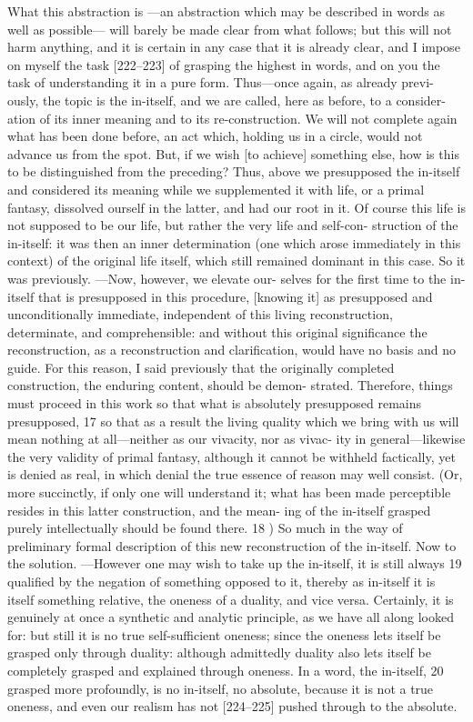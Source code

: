 What this abstraction is
—an abstraction which may be described in words as
well as possible—
will barely be made clear from what follows; but this will not
harm anything, and it is certain in any case that it is already clear, and I impose
on myself the task [222–223] of grasping the highest in words, and on you the
task of understanding it in a pure form.
Thus—once again, as already previ-
ously, the topic is the in-itself, and we are called, here as before, to a consider-
ation of its inner meaning and to its re-construction.
We will not complete
again what has been done before, an act which, holding us in a circle, would
not advance us from the spot.
But, if we wish [to achieve] something else, how
is this to be distinguished from the preceding? Thus, above we presupposed the
in-itself and considered its meaning while we supplemented it with life, or a
primal fantasy, dissolved ourself in the latter, and had our root in it.
Of course
this life is not supposed to be our life, but rather the very life and self-con-
struction of the in-itself: it was then an inner determination (one which arose
immediately in this context) of the original life itself, which still remained
dominant in this case.
So it was previously.
—Now, however, we elevate our-
selves for the first time to the in-itself that is presupposed in this procedure,
[knowing it] as presupposed and unconditionally immediate, independent of
this living reconstruction, determinate, and comprehensible: and without this
original significance the reconstruction, as a reconstruction and clarification,
would have no basis and no guide.
For this reason, I said previously that the
originally completed construction, the enduring content, should be demon-
strated.
Therefore, things must proceed in this work so that what is absolutely
presupposed remains presupposed, 17 so that as a result the living quality which
we bring with us will mean nothing at all—neither as our vivacity, nor as vivac-
ity in general—likewise the very validity of primal fantasy, although it cannot
be withheld factically, yet is denied as real, in which denial the true essence of
reason may well consist.
(Or, more succinctly, if only one will understand it;
what has been made perceptible resides in this latter construction, and the mean-
ing of the in-itself grasped purely intellectually should be found there.
18 )
So much in the way of preliminary formal description of this new
reconstruction of the in-itself.
Now to the solution.
—However one may
wish to take up the in-itself, it is still always 19 qualified by the negation of
something opposed to it, thereby as in-itself it is itself something relative,
the oneness of a duality, and vice versa.
Certainly, it is genuinely at once a
synthetic and analytic principle, as we have all along looked for: but still it
is no true self-sufficient oneness; since the oneness lets itself be grasped only
through duality: although admittedly duality also lets itself be completely
grasped and explained through oneness.
In a word, the in-itself, 20 grasped
more profoundly, is no in-itself, no absolute, because it is not a true oneness,
and even our realism has not [224–225] pushed through to the absolute.


